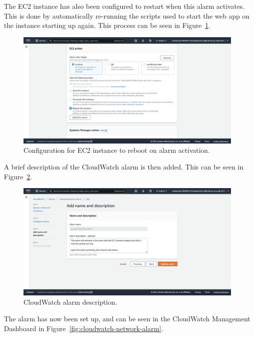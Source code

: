 \clearpage
The EC2 instance has also been configured to restart when this alarm activates.
This is done by automatically re-running the scripts used to start the web app on the instance starting up again.
This process can be seen in Figure~\ref{fig:cloudwatch-ec2-actions}.

\begin{figure}[!htbp]
    \centering
    \includegraphics[width=\textwidth]{resources/cloudwatch/cloudwatch-ec2-actions}
    \caption{Configuration for EC2 instance to reboot on alarm activation.}
    \label{fig:cloudwatch-ec2-actions}
\end{figure}

A brief description of the CloudWatch alarm is then added.
This can be seen in Figure~\ref{fig:cloudwatch-description}.

\begin{figure}[!htbp]
    \centering
    \includegraphics[width=\textwidth]{resources/cloudwatch/cloudwatch-description}
    \caption{CloudWatch alarm description.}
    \label{fig:cloudwatch-description}
\end{figure}

\clearpage
The alarm has now been set up, and can be seen in the CloudWatch Management Dashboard in Figure~\ref{fig:cloudwatch-network-alarm}.


